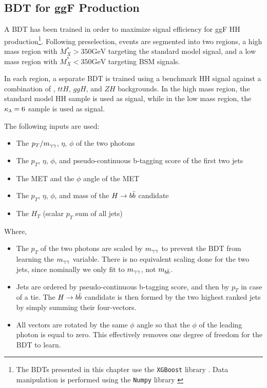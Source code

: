 \subsection{BDT for ggF Production} \label{ssec:ggf-bdt}
A \gls{BDT} has been trained in order to maximize signal efficiency for ggF HH production\footnote{The \glspl{BDT} presented in this chapter use the \texttt{XGBoost} library \cite{XGBoost}. Data manipulation is performed using the \texttt{Numpy} library \cite{numpy}}. Following preselection, events are segmented into two regions, a high mass region with $M_X^{*} > 350 \text{GeV}$ targeting the standard model signal, and a low mass region with $M_X^{*} < 350 \text{GeV}$ targeting BSM signals. 

In each region, a separate BDT is trained using a benchmark HH signal against a combination of \yy, $ttH$, $ggH$, and $ZH$ backgrounds. In the high mass region, the standard model HH sample is used as signal, while in the low mass region, the $\kappa_{\lambda} = 6$ sample is used as signal.

The following inputs are used:

\begin{itemize}
	\item{The $p_{T}/m_{\gamma\gamma}$, $\eta$, $\phi$ of the two photons} 
	\item{The $p_{T}$, $\eta$, $\phi$, and pseudo-continuous b-tagging score of the first two jets}
	\item{The MET and the $\phi$ angle of the MET}
	\item{The $p_{T}$, $\eta$, $\phi$, and mass of the $H\rightarrow b\bar{b}$ candidate}
	\item{The $H_{T}$ (scalar $p_{T}$ sum of all jets)}
\end{itemize}

Where,

\begin{itemize}
	\item{The $p_{T}$ of the two photons are scaled by $m_{\gamma\gamma}$ to prevent the BDT from learning the $m_{\gamma\gamma}$ variable. There is no equivalent scaling done for the two jets, since nominally we only fit to $m_{\gamma\gamma}$, not $m_{b\bar{b}}$.}
	\item{Jets are ordered by pseudo-continuous b-tagging score, and then by $p_{T}$ in case of a tie. The $H \rightarrow b\bar{b}$ candidate is then formed by the two highest ranked jets by simply summing their four-vectors.}
	\item{All vectors are rotated by the same $\phi$ angle so that the $\phi$ of the leading photon is equal to zero. This effectively removes one degree of freedom for the BDT to learn.}
\end{itemize}

